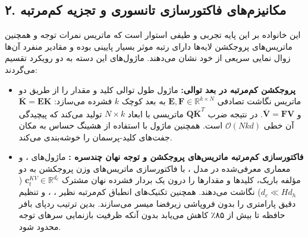 \documentclass[12pt,a4paper]{report}
\theoremstyle{definition}
\begin{document}
\subsection{۲. مکانیزم‌های فاکتورسازی تانسوری و تجزیه کم‌مرتبه }
این خانواده بر این پایه تجربی و طیفی استوار است که ماتریس نمرات توجه و همچنین ماتریس‌های پروجکشن لایه‌ها دارای رتبه موثر بسیار پایینی بوده و مقادیر منفرد آن‌ها زوال نمایی  سریعی از خود نشان می‌دهند. ماژول‌های این دسته به دو رویکرد تقسیم می‌گردند:
\begin{itemize}
    \item \textbf{پروجکشن کم‌مرتبه در بعد توالی:} ماژول  \cite{wang2020linformer} طول توالی کلید و مقدار را از طریق دو ماتریس نگاشت تصادفی $\mathbf{E}, \mathbf{F} \in \mathbb{R}^{k \times N}$ به بعد کوچک $k$ فشرده می‌سازد: $\overline{\mathbf{K}} = \mathbf{E}\mathbf{K}$ و $\overline{\mathbf{V}} = \mathbf{F}\mathbf{V}$. در نتیجه ضرب $\mathbf{Q}\overline{\mathbf{K}}^T$ ماتریسی با ابعاد $N \times k$ تولید می‌کند که پیچیدگی آن خطی $\mathcal{O}(N k d)$ است. همچنین ماژول  \cite{kitaev2020reformer} با استفاده از هشینگ حساس به مکان  جفت‌های کلید-پرسمان را خوشه‌بندی می‌کند.
    \item \textbf{فاکتورسازی کم‌مرتبه ماتریس‌های پروجکشن و توجه نهان چندسره :} ماژول‌های  \cite{yuan2023asvd}،  \cite{wang2024svdllm} و معماری  معرفی‌شده در مدل  \cite{deepseek2024mla, deepseek2024v2}، با فاکتورسازی ماتریس‌های وزن پروجکشن به دو مؤلفه باریک، کلیدها و مقدارها را درون یک بردار فشرده نهان مشترک $\mathbf{c}_t^{KV} \in \mathbb{R}^{d_c}$ ($d_c \ll H d_h$) نگاشت می‌دهند. همچنین تکنیک‌های انطباق کم‌مرتبه نظیر  \cite{zhang2023adalora}،  \cite{liu2024dora}،  \cite{kopiczko2024vera} و  \cite{meng2024pissa} تنظیم دقیق پارامتری را بدون فروپاشی زیرفضا میسر می‌سازند. بدین ترتیب ردپای بافر حافظه  تا بیش از ۸۵٪ کاهش می‌یابد بدون آنکه ظرفیت بازنمایی سرهای توجه محدود شود.
\end{itemize}
\end{document}
